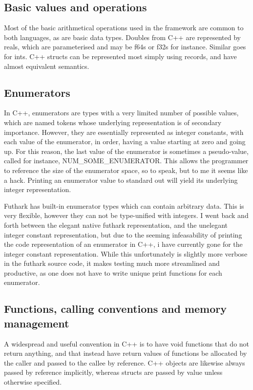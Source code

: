 \subsection{Basic values and operations}
Most of the basic arithmetical operations used in the framework are common to both languages, as are basic data types. Doubles from C++ are represented by reals, which are parameterised and may be f64s or f32s for instance. Similar goes for ints. C++ structs can be represented most simply using records, and have almost equivalent semantics.

 \cite{smallarraysbad}

\subsection{Enumerators}
In C++, enumerators are types with a very limited number of possible values, which are named tokens whose underlying representation is of secondary importance. However, they are essentially represented as integer constants, with each value of the enumerator, in order, having a value starting at zero and going up. For this reason, the last value of the enumerator is sometimes a pseudo-value, called for instance, NUM_SOME_ENUMERATOR. This allows the programmer to reference the size of the enumerator space, so to speak, but to me it seems like a hack. Printing an enumerator value to standard out will yield its underlying integer representation.

Futhark has built-in enumerator types which can contain arbitrary data. This is very flexible, however they can not be type-unified with integers. I went back and forth between the elegant native futhark representation, and the unelegant integer constant representation, but due to the seeming infeasability of printing the code representation of an enumerator in C++, i have currently gone for the integer constant representation. While this unfortunately is slightly more verbose in the futhark source code, it makes testing much more streamlined and productive, as one does not have to write unique print functions for each enumerator.


\subsection{Functions, calling conventions and memory management}
A widespread and useful convention in C++ is to have void functions that do not return anything, and that instead have return values of functions be allocated by the caller and passed to the callee by reference. C++ objects are likewise always passed by reference implicitly, whereas structs are passed by value unless otherwise specified.


